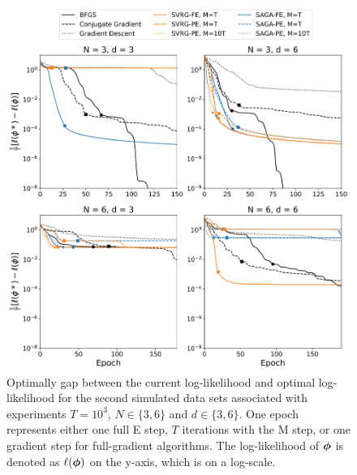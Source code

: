 \documentclass[12pt]{article}
\begin{document}
\begin{figure}[H]
    \centering
    \includegraphics[width=6.5in]{../plt/log-like_v_epoch_T-1000-001.png}
    \caption{Optimally gap between the current log-likelihood and optimal log-likelihood for the second simulated data sets associated with experiments $T=10^{3}$, $N \in \{3,6\}$ and $d \in \{3,6\}$. One epoch represents either one full E step, $T$ iterations with the M step, or one gradient step for full-gradient algorithms. The log-likelihood of $\boldsymbol{\phi}$ is denoted as $\ell(\boldsymbol{\phi})$ on the y-axis, which is on a log-scale.}
\end{figure}
%
\end{document}
